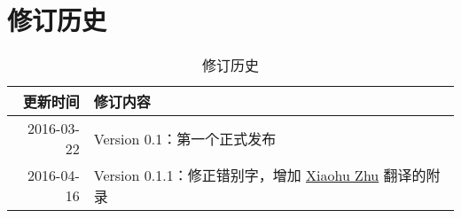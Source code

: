 
\chapter{修订历史}

\begin{table}[h]
  \centering
  \begin{tabularx}{0.9\textwidth}{ r X }
    \toprule
    \textbf{更新时间} & \textbf{修订内容}\\
		\midrule
    2016-03-22 & Version 0.1：第一个正式发布\\
    \midrule
    2016-04-16 & Version 0.1.1：修正错别字，增加 \href{mailto:xhzhu.nju@gmail}{Xiaohu Zhu} 翻译的附录\\
    \bottomrule
  \end{tabularx}
  \caption{修订历史}
\label{table:DocumentChanges}
\end{table}
